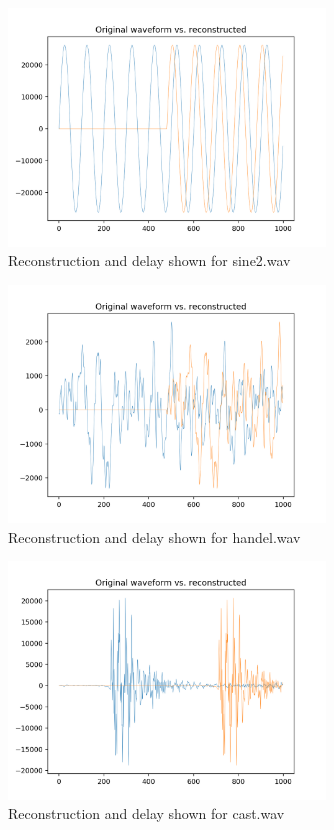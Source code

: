 \documentclass[11pt,a4paper]{article}
\begin{document}
\begin{figure}[ht]
	\centering
	\includegraphics[width=0.75\textwidth]{synthesis/sine2_delay}
	\caption{Reconstruction and delay shown for sine2.wav}
	\label{fig:synthesis_sine2}
\end{figure}

\begin{figure}[ht]
	\centering
	\includegraphics[width=0.75\textwidth]{synthesis/handel_delay}
	\caption{Reconstruction and delay shown for handel.wav}
	\label{fig:synthesis_handel}
\end{figure}

\pagebreak

\begin{figure}[ht]
	\centering
	\includegraphics[width=0.75\textwidth]{synthesis/cast_delay}
	\caption{Reconstruction and delay shown for cast.wav}
	\label{fig:synthesis_cast}
\end{figure}
\end{document}
